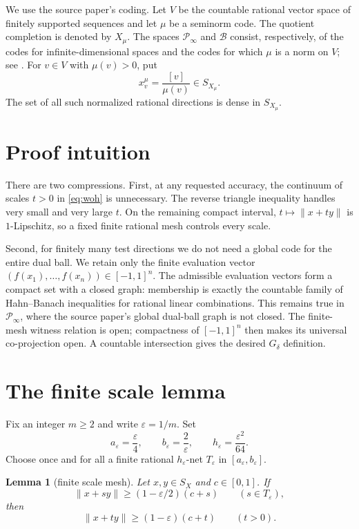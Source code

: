 \documentclass[11pt]{article}
\newtheorem{lemma}[theorem]{Lemma}
\newcommand{\norm}[1]{\lVert#1\rVert}
\newcommand{\Bcal}{\mathcal B}
\newcommand{\Pinf}{\mathcal P_\infty}
\begin{document}
We use the source paper's coding.  Let $V$ be the countable rational vector
space of finitely supported sequences and let $\mu$ be a seminorm code.
The quotient completion is denoted by $X_\mu$.  The spaces $\Pinf$ and
$\Bcal$ consist, respectively, of the codes for infinite-dimensional spaces
and the codes for which $\mu$ is a norm on $V$; see \cite{CDDK,source}.
For $v\in V$ with $\mu(v)>0$, put
\[
 x_v^\mu=\frac{[v]}{\mu(v)}\in S_{X_\mu}.
\]
The set of all such normalized rational directions is dense in $S_{X_\mu}$.

\section{Proof intuition}

There are two compressions.  First, at any requested accuracy, the continuum
of scales $t>0$ in \eqref{eq:woh} is unnecessary.  The reverse triangle
inequality handles very small and very large $t$.  On the remaining compact
interval, $t\mapsto\norm{x+t y}$ is $1$-Lipschitz, so a fixed finite rational
mesh controls every scale.

Second, for finitely many test directions we do not need a global code for
the entire dual ball.  We retain only the finite evaluation vector
$(f(x_1),\ldots,f(x_n))\in[-1,1]^n$.  The admissible evaluation vectors form
a compact set with a closed graph: membership is exactly the countable family
of Hahn--Banach inequalities for rational linear combinations.  This remains
true in $\Pinf$, where the source paper's global dual-ball graph is not
closed.  The finite-mesh witness relation is open; compactness of
$[-1,1]^n$ then makes its universal co-projection open.  A countable
intersection gives the desired $G_\delta$ definition.

\section{The finite scale lemma}

Fix an integer $m\geq2$ and write $\varepsilon=1/m$.  Set
\[
 a_\varepsilon=\frac{\varepsilon}{4},\qquad
 b_\varepsilon=\frac{2}{\varepsilon},\qquad
 h_\varepsilon=\frac{\varepsilon^2}{64}.
\]
Choose once and for all a finite rational $h_\varepsilon$-net
$T_\varepsilon$ in $[a_\varepsilon,b_\varepsilon]$.

\begin{lemma}[finite scale mesh]\label{lem:mesh}
Let $x,y\in S_X$ and $c\in[0,1]$.  If
\begin{equation}\label{eq:gridhalf}
 \norm{x+s y}\geq(1-\varepsilon/2)(c+s)
 \qquad(s\in T_\varepsilon),
\end{equation}
then
\begin{equation}\label{eq:allscale}
 \norm{x+t y}\geq(1-\varepsilon)(c+t)
 \qquad(t>0).
\end{equation}
\end{lemma}
\end{document}
